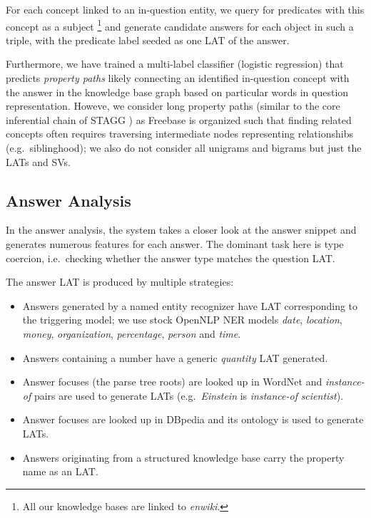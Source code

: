 For each concept
linked to an in-question entity, we query for predicates with this concept as a subject%
\footnote{All our knowledge bases are linked to \textit{enwiki}.}
and generate candidate answers for each object in such a triple, with the predicate label seeded as one LAT of the answer.


Furthermore, we have trained a multi-label classifier (logistic regression)
that predicts \textit{property paths}
likely connecting an identified in-question concept with the answer in the knowledge base
graph based on particular words in question representation. \citep{LeanFreebaseYao}
Howeve, we consider long property paths (similar to the core inferential chain of STAGG \citep{STAGG})
as Freebase is organized such that finding related concepts
often requires traversing intermediate nodes representing relationshibs (e.g.\ siblinghood);
we also do not consider all unigrams and bigrams but just the LATs and SVs.

\subsection{Answer Analysis}

In the answer analysis, the system takes a closer look at the answer snippet
and generates numerous features for each answer.
The dominant task here is type coercion,
i.e.\ checking whether the answer type matches the question LAT.

The answer LAT is produced by multiple strategies:
\begin{itemize}
	\item Answers generated by a named entity recognizer have LAT corresponding to the triggering model;
		we use stock OpenNLP NER models \textit{date}, \textit{location}, \textit{money}, \textit{organization}, \textit{percentage}, \textit{person} and \textit{time}.
	\item Answers containing a number have a generic \textit{quantity} LAT generated.
	\item Answer focuses (the parse tree roots) are looked up in WordNet and \textit{instance-of} pairs are used to generate LATs (e.g.\ \textit{Einstein} is \textit{instance-of} \textit{scientist}).
	\item Answer focuses are looked up in DBpedia and its ontology is used to generate LATs.
	\item Answers originating from a structured knowledge base carry the property name as an LAT.
\end{itemize}

